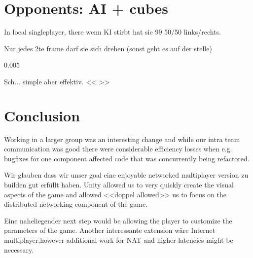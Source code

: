 \documentclass{report}
\begin{document}
\section{ Opponents: AI + cubes}
In local singleplayer, there 
wenn KI stirbt hat sie 99%
50/50 links/rechts.

Nur jedes 2te frame darf sie sich drehen (sonst geht es auf der stelle)

0.005%

Sch... simple aber effektiv.
<< >>


\section{Conclusion}
 Working in a larger group was an interesting change and while our intra team communication was good there were considerable efficiency losses when e.g. bugfixes for one component affected code that was concurrently being refactored.

 Wir glauben dass wir unser goal eine enjoyable networked multiplayer version zu builden gut erfüllt haben. Unity allowed us to very quickly create the visual aspects of the game and allowed <<doppel allowed>> us to focus on the distributed networking component of the game.

Eine naheliegender next step would be allowing the  player to customize the parameters of the game. Another interessante extension wäre Internet multiplayer,however additional work for NAT and higher latencies might be necessary.
\balancecolumns %


\end{document}
